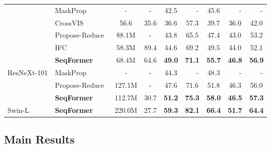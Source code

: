 \documentclass[runningheads]{llncs}
\begin{document}
\begin{table}[t]
\begin{center}
\begin{tabular}{l|l|c|c|ccccc}
 &MaskProp~\cite{MaskProp} &- &-  &42.5 &\ \ \  -   &45.6 &\ \ \  -   &\ \ \  -   \\  
 &CrossVIS~\cite{yang2021crossover}  &56.6   &35.6  &36.6 &57.3 &39.7 &36.0 &42.0 \\
 &Propose-Reduce~\cite{ProposeReduce}  &88.1M   &-  &43.8 &65.5 &47.4 &43.0 &53.2  \\
 &IFC~\cite{IFC}  &58.3M  &89.4  &44.6 &69.2 &49.5 &44.0 &52.1  \\  
 &\textbf{SeqFormer}   &68.4M   &64.6  &\textbf{49.0} &\textbf{71.1} &\textbf{55.7}   &\textbf{46.8}  &\textbf{56.9}  \\  
\hline
\multirow{3}{*}{ResNeXt-101}
 &MaskProp~\cite{MaskProp} &-  &- &44.3 &\ \ \  -   &48.3 &\ \ \  - &\ \ \  -  \\  
 &Propose-Reduce~\cite{ProposeReduce} &127.1M  &- &47.6 &71.6 &51.8 &46.3 &56.0   \\ 
  &\textbf{SeqFormer} &112.7M  &30.7 &\textbf{51.2}  &\textbf{75.3}  &\textbf{58.0} &\textbf{46.5} &\textbf{57.3}  \\  
\hline
 Swin-L   &\textbf{SeqFormer}  &220.0M   &27.7  &\textbf{59.3}  &\textbf{82.1}  &\textbf{66.4}  &\textbf{51.7}  &\textbf{64.4}  \\ 
\hline

\end{tabular}
\end{center}
\end{table}





\subsection{ Main Results }
\end{document}
